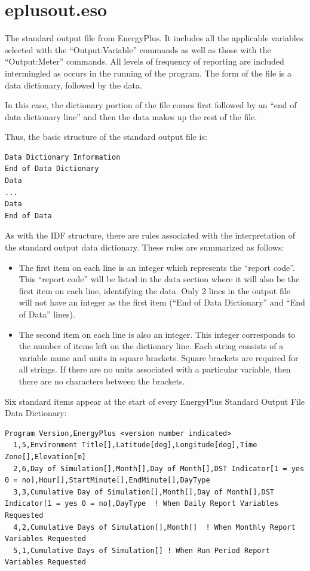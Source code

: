 \section{eplusout.eso}

The standard output file from EnergyPlus. It includes all the applicable variables selected with the “Output:Variable” commands as well as those with the “Output:Meter” commands. All levels of frequency of reporting are included intermingled as occurs in the running of the program. The form of the file is a data dictionary, followed by the data.

In this case, the dictionary portion of the file comes first followed by an “end of data dictionary line” and then the data makes up the rest of the file.

Thus, the basic structure of the standard output file is:

\begin{lstlisting}
Data Dictionary Information
End of Data Dictionary
Data
...
Data
End of Data
\end{lstlisting}

As with the IDF structure, there are rules associated with the interpretation of the standard output data dictionary. These rules are summarized as follows:

\begin{itemize}
  \item The first item on each line is an integer which represents the “report code”. This “report code” will be listed in the data section where it will also be the first item on each line, identifying the data. Only 2 lines in the output file will not have an integer as the first item (“End of Data Dictionary” and “End of Data” lines).

  \item The second item on each line is also an integer. This integer corresponds to the number of items left on the dictionary line. Each string consists of a variable name and units in square brackets. Square brackets are required for all strings. If there are no units associated with a particular variable, then there are no characters between the brackets.
\end{itemize}

Six standard items appear at the start of every EnergyPlus Standard Output File Data Dictionary:

\begin{lstlisting}
Program Version,EnergyPlus <version number indicated>
  1,5,Environment Title[],Latitude[deg],Longitude[deg],Time Zone[],Elevation[m]
  2,6,Day of Simulation[],Month[],Day of Month[],DST Indicator[1 = yes 0 = no],Hour[],StartMinute[],EndMinute[],DayType
  3,3,Cumulative Day of Simulation[],Month[],Day of Month[],DST Indicator[1 = yes 0 = no],DayType  ! When Daily Report Variables Requested
  4,2,Cumulative Days of Simulation[],Month[]  ! When Monthly Report Variables Requested
  5,1,Cumulative Days of Simulation[] ! When Run Period Report Variables Requested
\end{lstlisting}

